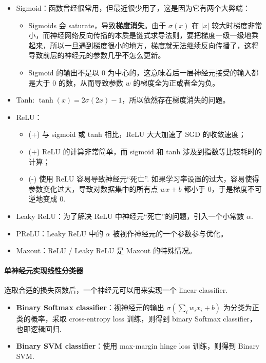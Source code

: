 \begin{itemize}
    \item Sigmoid：函数曾经很常用，但最近很少用了，这是因为它有两个大弊端：
    \begin{itemize}
        \item Sigmoids 会 saturate，导致\textbf{梯度消失}。由于 $\sigma(x)$ 在 $|x|$ 较大时梯度非常小，而神经网络反向传播的本质是链式求导法则，要把梯度一级一级地乘起来，所以一旦遇到梯度很小的地方，梯度就无法继续反向传播了，这将导致前层的神经元的参数几乎不怎么更新。
        \item Sigmoid 的输出不是以 $0$ 为中心的，这意味着后一层神经元接受的输入都是大于 $0$ 的数，从而导致参数 $w$ 的梯度全为正或者全为负。
    \end{itemize}
    \item Tanh: $\tanh(x)=2\sigma(2x)-1$，所以依然存在梯度消失的问题。
    \item ReLU：
    \begin{itemize}
        \item (+) 与 sigmoid 或 tanh 相比，ReLU 大大加速了 $\text{SGD}$ 的收敛速度；
        \item (+) ReLU 的计算非常简单，而 sigmoid 和 tanh 涉及到指数等比较耗时的计算；
        \item (-) 使用 ReLU 容易导致神经元“死亡”. 如果学习率设置的过大，容易使得参数变化过大，导致对数据集中的所有点 $wx+b$ 都小于 $0$，于是梯度不可逆地变成 $0$.
    \end{itemize}
    \item Leaky ReLU：为了解决 ReLU 中神经元“死亡”的问题，引入一个小常数 $\alpha$.
    \item PReLU：Leaky ReLU 中的 $\alpha$ 被视作神经元的一个参数参与优化。
    \item Maxout：ReLU / Leaky ReLU 是 Maxout 的特殊情况。
\end{itemize}


\paragraph{单神经元实现线性分类器}

选取合适的损失函数后，一个神经元可以用来实现一个 linear classifier.

\begin{itemize}
    \item \textbf{Binary Softmax classifier}：视神经元的输出 $\sigma\left(\sum_iw_ix_i+b\right)$ 为分类为正类的概率，采取 cross-entropy loss 训练，则得到 binary Softmax classifier，也即逻辑回归.
    \item \textbf{Binary SVM classifier}：使用 max-margin hinge loss 训练，则得到 Binary SVM.
\end{itemize}

